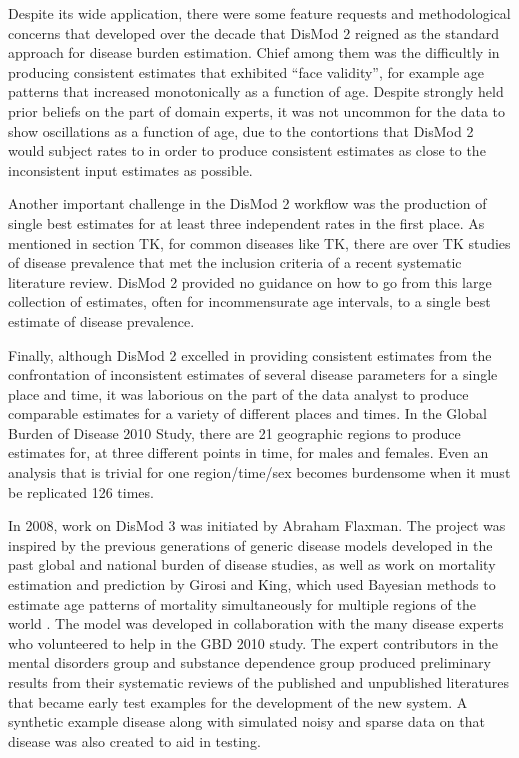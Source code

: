 Despite its wide application, there were some feature requests and
methodological concerns that developed over the decade that DisMod 2
reigned as the standard approach for disease burden estimation. Chief
among them was the difficultly in producing consistent estimates that
exhibited ``face validity'', for example age patterns that increased
monotonically as a function of age. Despite strongly held prior
beliefs on the part of domain experts, it was not uncommon for the
data to show oscillations as a function of age, due to the contortions
that DisMod 2 would subject rates to in order to produce consistent
estimates as close to the inconsistent input estimates as possible.

Another important challenge in the DisMod 2 workflow was the
production of single best estimates for at least three independent
rates in the first place. As mentioned in section TK, for common
diseases like TK, there are over TK studies of disease prevalence that
met the inclusion criteria of a recent systematic literature
review. DisMod 2 provided no guidance on how to go from this large
collection of estimates, often for incommensurate age intervals, to a
single best estimate of disease prevalence.

Finally, although DisMod 2 excelled in providing consistent estimates
from the confrontation of inconsistent estimates of several disease
parameters for a single place and time, it was laborious on the part
of the data analyst to produce comparable estimates for a variety of
different places and times. In the Global Burden of Disease 2010
Study, there are 21 geographic regions to produce estimates for, at
three different points in time, for males and females. Even an
analysis that is trivial for one region/time/sex becomes burdensome
when it must be replicated 126 times.

In 2008, work on DisMod 3 was initiated by Abraham Flaxman. The
project was inspired by the previous generations of generic disease
models developed in the past global and national burden of disease
studies, as well as work on mortality estimation and prediction by
Girosi and King, which used Bayesian methods to estimate age patterns
of mortality simultaneously for multiple regions of the world
\cite{Girosi_Demographic_2008}. The model was developed in
collaboration with the many disease experts who volunteered to help in
the GBD 2010 study. The expert contributors in the mental disorders
group and substance dependence group produced preliminary results from
their systematic reviews of the published and unpublished literatures
that became early test examples for the development of the new
system. A synthetic example disease along with simulated noisy and
sparse data on that disease was also created to aid in testing.

